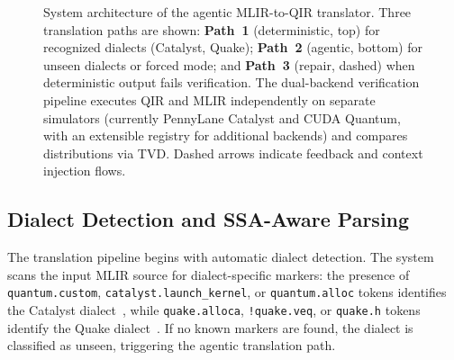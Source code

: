 \documentclass[conference]{IEEEtran}
\begin{document}
\begin{figure}[t]
\caption{System architecture of the agentic MLIR-to-QIR translator. Three translation paths are shown: \textbf{Path~1} (deterministic, top) for recognized dialects (Catalyst, Quake); \textbf{Path~2} (agentic, bottom) for unseen dialects or forced mode; and \textbf{Path~3} (repair, dashed) when deterministic output fails verification. The dual-backend verification pipeline executes QIR and MLIR independently on separate simulators (currently PennyLane Catalyst and CUDA Quantum, with an extensible registry for additional backends) and compares distributions via TVD. Dashed arrows indicate feedback and context injection flows.}
\label{fig:architecture}
\end{figure}

\subsection{Dialect Detection and SSA-Aware Parsing}\label{sec:parsing}

The translation pipeline begins with automatic dialect detection. The system scans the input MLIR source for dialect-specific markers: the presence of \texttt{quantum.custom}, \texttt{catalyst.launch\_kernel}, or \texttt{quantum.alloc} tokens identifies the Catalyst dialect~\cite{ittah2024catalyst}, while \texttt{quake.alloca}, \texttt{!quake.veq}, or \texttt{quake.h} tokens identify the Quake dialect~\cite{kim2023cudaquantum}. If no known markers are found, the dialect is classified as unseen, triggering the agentic translation path.
\end{document}
